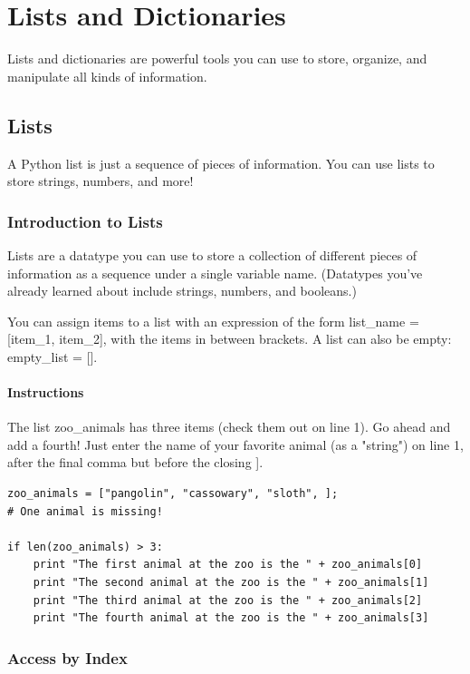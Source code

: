 \documentclass[12pt,a4paper,final,twoside,onecolumn,titlepage]{book}
\begin{document}
\chapter{Lists and Dictionaries}
Lists and dictionaries are powerful tools you can use to store, organize, and manipulate all kinds of information.

\section{Lists}
A Python list is just a sequence of pieces of information. You can use lists to store strings, numbers, and more!
\subsection{Introduction to Lists}

Lists are a datatype you can use to store a collection of different pieces of information as a sequence under a single variable name. (Datatypes you've already learned about include strings, numbers, and booleans.)

You can assign items to a list with an expression of the form list\_name = [item\_1, item\_2], with the items in between brackets. A list can also be empty: empty\_list = [].

\subsubsection{Instructions}

The list zoo\_animals has three items (check them out on line 1). Go ahead and add a fourth! Just enter the name of your favorite animal (as a "string") on line 1, after the final comma but before the closing ].

\begin{lstlisting}
zoo_animals = ["pangolin", "cassowary", "sloth", ];
# One animal is missing!

if len(zoo_animals) > 3:
	print "The first animal at the zoo is the " + zoo_animals[0]
	print "The second animal at the zoo is the " + zoo_animals[1]
	print "The third animal at the zoo is the " + zoo_animals[2]
	print "The fourth animal at the zoo is the " + zoo_animals[3]
\end{lstlisting}

\subsection{Access by Index}
\end{document}
